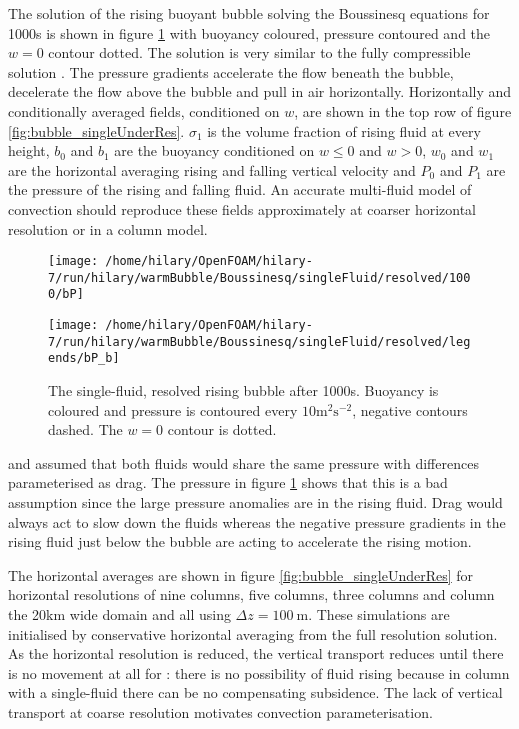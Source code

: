 \documentclass[draft]{agujournal2019}
\begin{document}
The solution of the  rising buoyant bubble solving the Boussinesq equations
for 1000s is shown in figure \ref{fig:bubble} with buoyancy coloured,
pressure contoured and the $w=0$ contour dotted. The solution is
very similar to the fully compressible solution \cite{BF02}. The
pressure gradients accelerate the flow beneath the bubble, decelerate
the flow above the bubble and pull in air horizontally. Horizontally
and conditionally averaged fields, conditioned on $w$, are shown
in the top row of figure \ref{fig:bubble_singleUnderRes}. $\sigma_{1}$
is the volume fraction of rising fluid at every height, $b_{0}$ and
$b_{1}$ are the buoyancy conditioned on $w\le0$ and $w>0$, $w_{0}$
and $w_{1}$ are the horizontal averaging rising and falling vertical
velocity and $P_{0}$ and $P_{1}$ are the pressure of the rising
and falling fluid. An accurate multi-fluid model of convection should
reproduce these fields approximately at coarser horizontal resolution
or in a  column model. 

\begin{figure}
\noindent \begin{centering}
\texttt{[image: /home/hilary/OpenFOAM/hilary-7/run/hilary/warmBubble/Boussinesq/singleFluid/resolved/1000/bP]}
\par\end{centering}
\noindent \begin{centering}
\texttt{[image: /home/hilary/OpenFOAM/hilary-7/run/hilary/warmBubble/Boussinesq/singleFluid/resolved/legends/bP\_b]}
\par\end{centering}
\caption{The single-fluid, resolved  rising bubble after 1000s. Buoyancy is
coloured and pressure is contoured every $10\text{m}^{2}\text{s}^{-2}$,
negative contours dashed. The $w=0$ contour is dotted.
\label{fig:bubble}}
\end{figure}

 and  assumed that both fluids would share
the same pressure with differences parameterised as drag. The pressure
in figure \ref{fig:bubble} shows that this is a bad assumption since
the large pressure anomalies are in the rising fluid. Drag would always
act to slow down the fluids whereas the negative pressure gradients
in the rising fluid just below the bubble are acting to accelerate
the rising motion. 

The horizontal averages are shown in figure \ref{fig:bubble_singleUnderRes}
for horizontal resolutions of nine columns, five columns, three columns
and  column  the 20km wide domain and all  using
$\Delta z=100\ \text{m}$. These simulations are initialised by conservative
horizontal averaging from the full resolution solution. As the horizontal
resolution is reduced, the vertical transport reduces until there
is no movement at all for : there is no possibility
of fluid rising because in  column with a single-fluid there
can be no compensating subsidence. The lack of vertical transport
at coarse resolution motivates convection parameterisation. 
\end{document}
